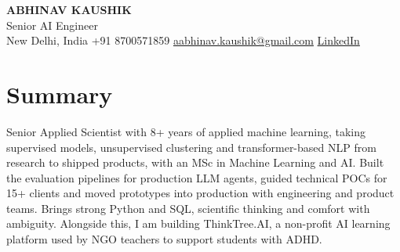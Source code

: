 \documentclass[10pt,a4paper]{article}
\begin{document}
\begin{center}
  {\LARGE\bfseries ABHINAV KAUSHIK}\\[2pt]
  {\large Senior AI Engineer}\\[2pt]
  New Delhi, India \textbar{} +91 8700571859 \textbar{} \href{mailto:aabhinav.kaushik@gmail.com}{aabhinav.kaushik@gmail.com} \textbar{} \href{https://www.linkedin.com/in/abhinav-kaushik10/}{LinkedIn}  
\end{center}

\section{Summary}
Senior Applied Scientist with 8+ years of applied machine learning, taking supervised models, unsupervised clustering and transformer-based NLP from research to shipped products, with an MSc in Machine Learning and AI. Built the evaluation pipelines for production LLM agents, guided technical POCs for 15+ clients and moved prototypes into production with engineering and product teams. Brings strong Python and SQL, scientific thinking and comfort with ambiguity. Alongside this, I am building ThinkTree.AI, a non-profit AI learning platform used by NGO teachers to support students with ADHD.
\end{document}
